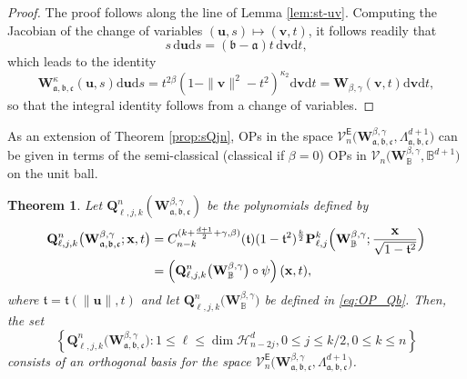 \documentclass{amsart}
\newtheorem{thm}{Theorem}[section]
\theoremstyle{remark}
\def\d{\mathrm{d}}
\def\sE{{\mathsf E}}
\def\fa{{\mathfrak a}}
\def\fb{{\mathfrak b}}
\def\fc{{\mathfrak c}}
\def\ft{{\mathfrak t}}
\def\b{{\beta}}
\def\g{{\gamma}}
\def\k{{\kappa}}
\def\ub{{\mathbf u}}
\def\vb{{\mathbf v}}
\def\xb{{\mathbf x}}
\def\Pb{{\mathbf P}}
\def\Qb{{\mathbf Q}}
\def\Wb{{\mathbf W}}
\def\CH{{\mathcal H}}
\def\CV{{\mathcal V}}
\def\BB{{\mathbb B}}
\begin{document}
\begin{proof}
The proof follows along the line of Lemma \ref{lem:st-uv}. Computing the Jacobian of the change of variables 
$(\ub,s) \mapsto (\vb,t)$, it follows readily that 
$$
s \, \d \ub \d s = (\fb - \fa)t\, \d \vb \d t, 
$$
which leads to the identity 
$$
      \Wb_{\fa,\fb,\fc}^{\k} (\ub,s) \d \ub \d s =  t^{2\b} \left(1-\|\vb\|^2-t^2\right)^{\k_2} \d \vb \d t= \Wb_{\b,\g}(\vb,t) \d \vb \d t,
$$
so that the integral identity follows from a change of variables. 
\end{proof}

As an extension of Theorem \ref{prop:sQjn}, OPs in the space 
$\CV_n^\sE\big(\Wb_{\fa,\fb,\fc}^{\b,\g}, \Lambda_{\fa,\fb,\fc}^{d+1}\big)$ can be given in terms of the 
semi-classical (classical if $\b =0$) OPs in $\CV_n\big(\Wb_\BB^{\b,\g}, \BB^{d+1})$ on the unit ball. 

\begin{thm}\label{thm:QljnX}
Let $\Qb_{\ell, j, k}^n(\Wb_{\fa,\fb,\fc}^{\b,\g})$ be the polynomials defined by
\begin{align} \label{Q=Q}
 \Qb_{\ell, j, k}^n\big(\Wb_{\fa,\fb,\fc}^{\b,\g}; \xb,t \big)
 & =  
   C_{n-k}^{(k + \frac{d+1}2 +\g,\b)}(\ft) (1-\ft^2)^{\frac{k}{2}} 
         \Pb_{\ell,j}^k \Big(\Wb_\BB^{\b,\g}; \frac {\xb} {\sqrt{1-\ft^2} } \Big) \\
 &  = \left(\Qb_{\ell, j, k}^n \big(\Wb_\BB^{\b,\g}\big) \circ \psi \right) (\xb,t), \notag
\end{align}
where $\ft = \ft (\|\ub\|, t)$ and let $\Qb_{\ell, j, k}^n \big(\Wb_\BB^{\b,\g}\big)$ be defined in \eqref{eq:OP_Qb}. 
Then, the set 
$$
\left \{ \Qb_{\ell,j,k}^n\big(\Wb_{\fa,\fb,\fc}^{\b,\g}\big):  1 \le \ell \le \dim \CH_{n-2j}^d, 0 \le j \le k/2, 0\le k \le n \right\}
$$ 
consists of an orthogonal basis for the space $\CV_n^\sE\big(\Wb_{\fa,\fb,\fc}^{\b,\g}, \Lambda_{\fa,\fb,\fc}^{d+1}\big)$. 
\end{thm}
\end{document}

